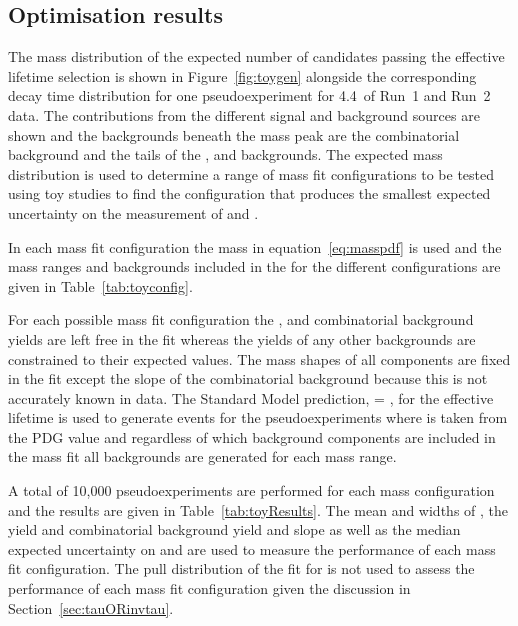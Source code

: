 \subsection{Optimisation results}
\label{sec:toyresults}

The mass distribution of the expected number of \bsmumu candidates passing the effective lifetime selection is shown in Figure~\ref{fig:toygen} alongside the corresponding decay time distribution for one pseudoexperiment for 4.4~\fb of Run~1 and Run~2 data. 
The contributions from the different signal and background sources are shown and the backgrounds beneath the \bs mass peak are the combinatorial background and the tails of the \bhh, \bdmum and \lambdab backgrounds. The expected mass distribution is used to determine a range of mass fit configurations to be tested using toy studies to find the configuration that produces the smallest expected uncertainty on the measurement of \tmumu and \Gmumu.



In each mass fit configuration the mass \pdf in equation~\ref{eq:masspdf} is used and the mass ranges and backgrounds included in the \pdf for the different configurations are given in Table~\ref{tab:toyconfig}.


For each possible mass fit configuration the \bsmumu, \bdmumu and combinatorial background yields are left free in the fit whereas the yields of any other backgrounds are constrained to their expected values. The mass shapes of all components are fixed in the \ml fit except the slope of the combinatorial background because this is not accurately known in data. 
The Standard Model prediction, \tmumu = \tH, for the \bsmumu effective lifetime is used to generate events for the pseudoexperiments where \tH is taken from the PDG value and regardless of which background components are included in the mass fit all backgrounds are generated for each mass range. %

A total of 10,000 pseudoexperiments are performed for each mass configuration and the results are given in Table~\ref{tab:toyResults}. The mean and widths of \Gmumu, the \bsmumu yield and combinatorial background yield and slope as well as the median expected uncertainty on \tmumu and \Gmumu are used to measure the performance of each mass fit configuration. The pull distribution of the fit for \tmumu is not used to assess the performance of each mass fit configuration given the discussion in Section~\ref{sec:tauORinvtau}.




